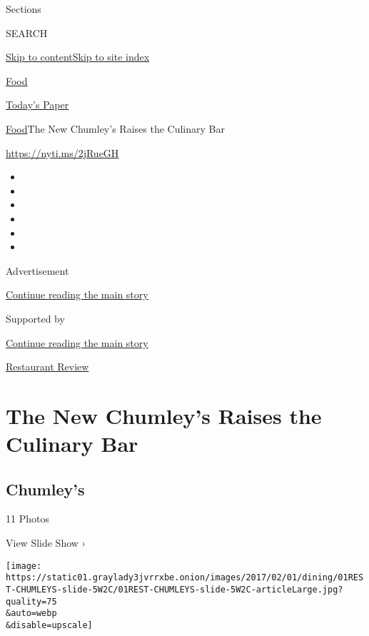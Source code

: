 Sections

SEARCH

\protect\hyperlink{site-content}{Skip to
content}\protect\hyperlink{site-index}{Skip to site index}

\href{https://www.nytimes3xbfgragh.onion/section/food}{Food}

\href{https://myaccount.nytimes3xbfgragh.onion/auth/login?response_type=cookie\&client_id=vi}{}

\href{https://www.nytimes3xbfgragh.onion/section/todayspaper}{Today's
Paper}

\href{/section/food}{Food}\textbar{}The New Chumley's Raises the
Culinary Bar

\url{https://nyti.ms/2jRueGH}

\begin{itemize}
\item
\item
\item
\item
\item
\item
\end{itemize}

Advertisement

\protect\hyperlink{after-top}{Continue reading the main story}

Supported by

\protect\hyperlink{after-sponsor}{Continue reading the main story}

\href{/column/restaurant-review}{Restaurant Review}

\hypertarget{the-new-chumleys-raises-the-culinary-bar}{%
\section{The New Chumley's Raises the Culinary
Bar}\label{the-new-chumleys-raises-the-culinary-bar}}

\href{https://www.nytimes3xbfgragh.onion/slideshow/2017/01/31/dining/chumleys.html}{}

\hypertarget{chumleys}{%
\subsection{Chumley's}\label{chumleys}}

11 Photos

View Slide Show ›

\texttt{[image: https://static01.graylady3jvrrxbe.onion/images/2017/02/01/dining/01REST-CHUMLEYS-slide-5W2C/01REST-CHUMLEYS-slide-5W2C-articleLarge.jpg?quality=75\\\&auto=webp\\\&disable=upscale]}

